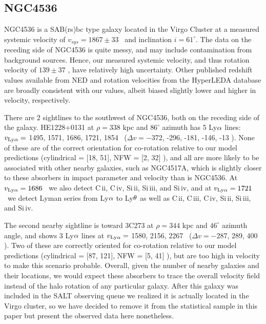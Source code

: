 



\subsection{NGC4536}
NGC4536 is a SAB(rs)bc type galaxy located in the Virgo Cluster at a measured systemic velocity of $v_{sys} = 1867 \pm 33$ \kms~and inclination $i = 61^{\circ}$. The data on the receding side of NGC4536 is quite messy, and may include contamination from background sources. Hence, our measured systemic velocity, and thus rotation velocity of $139 \pm 37$ \kms, have relatively high uncertainty. Other published redshift values available from NED and rotation velocities from the HyperLEDA database are broadly consistent with our values, albeit biased slightly lower and higher in velocity, respectively.

There are 2 sightlines to the southwest of NGC4536, both on the receding side of the galaxy. HE1228+0131 at $ \rho = 338$ kpc and $86^{\circ}$ azimuth has 5 Ly$\rm \alpha$ lines: $v_{\rm Ly\alpha} =$ 1495, 1571, 1686, 1721, 1854 \kms~($\Delta v = -$372, -296, -181, -146, -13 \kms). None of these are of the correct orientation for co-rotation relative to our model predictions (cylindrical = [18, 51], NFW = [2, 32] \kms), and all are more likely to be associated with other nearby galaxies, such as NGC4517A, which is slightly closer to these absorbers in impact parameter and velocity than is NGC4536. At $v_{\rm Ly\alpha}  = 1686$ \kms~we also detect C\,{\sc ii}, C\,{\sc iv}, Si\,{\sc ii}, Si\,{\sc iii}, and Si\,{\sc iv}, and at $v_{\rm Ly\alpha}  = 1721$ \kms~we detect Lyman series from Ly$\rm \alpha$ to Ly$\rm \theta$ as well as C\,{\sc ii}, C\,{\sc iii}, C\,{\sc iv}, Si\,{\sc ii}, Si\,{\sc iii}, and Si\,{\sc iv}.

The second nearby sightline is toward 3C273 at $\rho = 344$ kpc and $46^{\circ}$ azimuth angle, and shows 3 Ly$\rm \alpha$ lines at $v_{\rm Ly\alpha} =$ 1580, 2156, 2267 \kms~($\Delta v = -$287, 289, 400 \kms). Two of these are correctly oriented for co-rotation relative to our model predictions (cylindrical = [87, 121], NFW = [5, 41] \kms), but are too high in velocity to make this scenario probable. Overall, given the number of nearby galaxies and their locations, we would expect these absorbers to trace the overall velocity field instead of the halo rotation of any particular galaxy. After this galaxy was included in the SALT observing queue we realized it is actually located in the Virgo cluster, so we have decided to remove it from the statistical sample in this paper but present the observed data here nonetheless.

